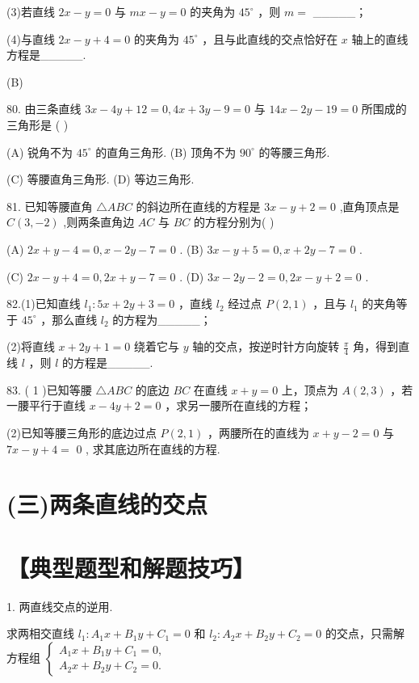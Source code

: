 \documentclass[10pt]{article}
\begin{document}
(3)若直线 \({2x} - y = 0\) 与 \({mx} - y = 0\) 的夹角为 \({45}^{ \circ  }\) ，则 \(m =\) \_\_\_\_\_；

(4)与直线 \({2x} - y + 4 = 0\) 的夹角为 \({45}^{ \circ  }\) ，且与此直线的交点恰好在 \(x\) 轴上的直线方程是\_\_\_\_\_.

(B)

80. 由三条直线 \({3x} - {4y} + {12} = 0,{4x} + {3y} - 9 = 0\) 与 \({14x} - {2y} - {19} = 0\) 所围成的三角形是 ( )

(A) 锐角不为 \({45}^{ \circ  }\) 的直角三角形. (B) 顶角不为 \({90}^{ \circ  }\) 的等腰三角形.

(C) 等腰直角三角形. (D) 等边三角形.

81. 已知等腰直角 \(\bigtriangleup {ABC}\) 的斜边所在直线的方程是 \({3x} - y + 2 = 0\) ,直角顶点是 \(C\left( {3, - 2}\right)\) ,则两条直角边 \({AC}\) 与 \({BC}\) 的方程分别为( )

(A) \({2x} + y - 4 = 0,x - {2y} - 7 = 0\) . (B) \({3x} - y + 5 = 0,x + {2y} - 7 = 0\) .

(C) \({2x} - y + 4 = 0,{2x} + y - 7 = 0\) . (D) \({3x} - {2y} - 2 = 0,{2x} - y + 2 = 0\) .

82.(1)已知直线 \({l}_{1} : {{5x} + {2y} + 3} = 0\) ，直线 \({l}_{2}\) 经过点 \(P\left( {2,1}\right)\) ，且与 \({l}_{1}\) 的夹角等于 \({45}^{ \circ  }\) ，那么直线 \({l}_{2}\) 的方程为\_\_\_\_\_；

(2)将直线 \(x + {2y} + 1 = 0\) 绕着它与 \(y\) 轴的交点，按逆时针方向旋转 \(\frac{\pi }{4}\) 角，得到直线 \(l\) ，则 \(l\) 的方程是\_\_\_\_\_.

83. ( 1 )已知等腰 \(\bigtriangleup  {ABC}\) 的底边 \({BC}\) 在直线 \(x + y = 0\) 上，顶点为 \(A\left( {2,3}\right)\) ，若一腰平行于直线 \(x - {4y} + 2 = 0\) ，求另一腰所在直线的方程；

(2)已知等腰三角形的底边过点 \(P\left( {2,1}\right)\) ，两腰所在的直线为 \(x + y - 2 = 0\) 与 \({7x} - y + 4 =\) 0 , 求其底边所在直线的方程.

\section*{(三)两条直线的交点}

\section*{【典型题型和解题技巧】}

1. 两直线交点的逆用.

求两相交直线 \({l}_{1} : {A}_{1}x + {B}_{1}y + {C}_{1} = 0\) 和 \({l}_{2} : {A}_{2}x + {B}_{2}y + {C}_{2} = 0\) 的交点，只需解方程组 \(\left\{  \begin{array}{l} {A}_{1}x + {B}_{1}y + {C}_{1} = 0, \\  {A}_{2}x + {B}_{2}y + {C}_{2} = 0. \end{array}\right.\)
\end{document}
